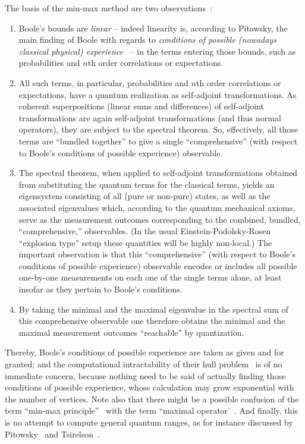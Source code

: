 \documentclass[%
  twocolumn,
 showpacs,
 showkeys,
 preprintnumbers,
 amsmath,amssymb,
 aps,
  pra,
  longbibliography,
 floatfix,
 ]{revtex4-1}
\begin{document}
The basis of the min-max method are two observations~\cite{filipp-svo-04-qpoly-prl}:
\begin{enumerate}
\item
Boole's bounds  are {\em linear}  -- indeed linearity is, according to Pitowsky\cite{Pit-94},
the main finding of Boole with regards to {\em conditions of possible (nowadays classical physical) experience}~\cite{Boole,Boole-62}  --
in the terms entering those bounds, such as probabilities and $n$th order correlations or expectations.
\item
All such terms, in particular, probabilities and $n$th order correlations or expectations,
have a quantum realization as self-adjoint transformations. As coherent superpositions (linear sums and differences) of self-adjoint  transformations are again self-adjoint  transformations (and thus normal operators), they are subject to the spectral theorem. So, effectively, all those terms are ``bundled together'' to give a single ``comprehensive'' (with respect to Boole's conditions of possible experience) observable.
\item
The spectral theorem, when applied to self-adjoint  transformations obtained from substituting the quantum terms for the classical terms, yields an eigensystem consisting of all (pure or non-pure) states, as well as the associated eigenvalues which,
according to the quantum mechanical axioms,  serve as the measurement outcomes corresponding to the combined, bundled, ``comprehensive,'' observables. (In the usual Einstein-Podolsky-Rosen ``explosion type'' setup these quantities will be highly non-local.) The important observation is that this ``comprehensive'' (with respect to Boole's conditions of possible experience) observable encodes or includes all possible one-by-one measurements on each one of the single terms alone,
at least insofar as they pertain to Boole's conditions.
\item
By taking the minimal and the maximal eigenvalue in the spectral sum of this comprehensive observable one therefore obtains the minimal and the maximal measurement outcomes ``reachable'' by quantization.
\end{enumerate}

Thereby, Boole's conditions of possible
experience are taken as given and for granted; and the computational intractability of their hull problem~\cite{Pit-91}
is of no immediate concern, because nothing need to be said of actually finding  those conditions of possible experience, whose
calculation may grow exponential with the number of vertices.
Note also that there might be a possible confusion of the term ``min-max principle''~\cite[{\S}~90]{halmos-vs} with
the term ``maximal operator'~\cite[{\S}~84]{halmos-vs}.
And finally, this is no attempt to compute general quantum ranges,
as for instance discussed by Pitowsky~\cite{pitowsky-86,pit:range-2001,Pitowsky-08-ge}
and Tsirelson~\cite{cirelson:80,cirelson:87,cirelson}.
\end{document}

